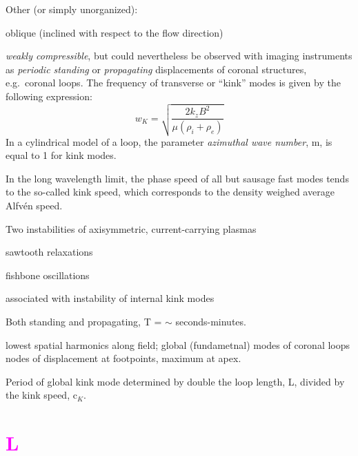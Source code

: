 \documentclass[12pt]{article}
\begin{document}
Other (or simply unorganized):
\begin{itemize*}
    \item oblique (inclined with respect to the flow direction)
    \item \emph{weakly compressible}, but could nevertheless be
        observed with imaging instruments as \emph{periodic standing}
        or \emph{propagating} displacements of coronal structures, e.g.\ coronal loops.
        The frequency of transverse or ``kink'' modes is given by the following expression:
            $$ w_K = \sqrt{ \frac{2k_zB^2}{\mu(\rho_i+\rho_e)}  }   $$
        In a cylindrical model of a loop,
        the parameter \emph{azimuthal wave number},
        m, is equal to 1 for kink modes.
    \item In the long wavelength limit, the phase speed of all but
        sausage fast modes tends to the so-called kink speed,
        which corresponds to the density weighed average Alfv\'en speed.
    \item Two instabilities of axisymmetric, current-carrying plasmas
        \begin{itemize*}
            \item sawtooth relaxations
            \item fishbone oscillations
        \end{itemize*}
        associated with instability of internal kink modes
    \item Both standing and propagating, T = $\sim$ seconds-minutes.
    \item lowest spatial harmonics along field; global (fundametnal)
        modes of coronal loops nodes of displacement at footpoints,
        maximum at apex.
    \item Period of global kink mode determined by double the loop length,
        L, divided by the kink speed, c$_K$.
\end{itemize*}


\section*{\textcolor{magenta}{L}}
\end{document}
